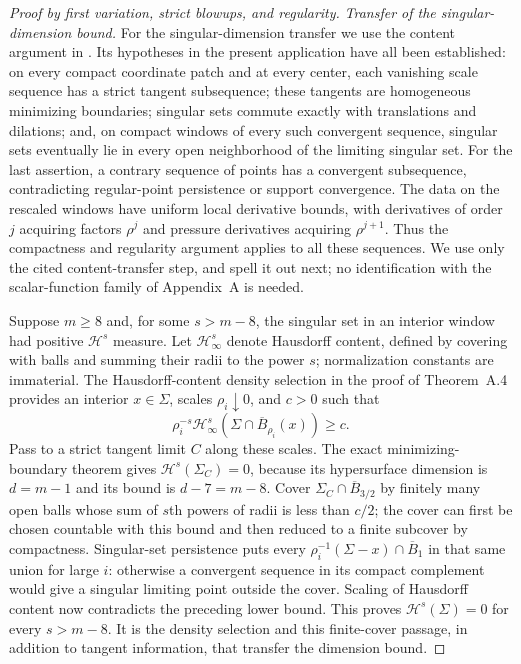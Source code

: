 \documentclass[11pt]{article}
\numberwithin{equation}{section}
\theoremstyle{definition}
\theoremstyle{remark}
\begin{document}
\begin{proof}[Proof by first variation, strict blowups, and regularity]
\emph{Transfer of the singular-dimension bound.}
For the singular-dimension transfer we use the content argument in
\citet[Chapter~1, Theorem~3.26(2), and Appendix~A, proof of Theorem~A.4,
step~(1)]{simonGMT}.
Its hypotheses in the present application have all been established:
on every compact coordinate patch and at every center, each vanishing
scale sequence has a strict tangent subsequence; these tangents are
homogeneous minimizing boundaries; singular sets commute exactly with
translations and dilations; and, on compact windows of every such
convergent sequence, singular sets eventually lie in every open
neighborhood of the limiting singular set.  For the last assertion,
a contrary sequence of points has a convergent subsequence, contradicting
regular-point persistence or support convergence.  The data on the
rescaled windows have uniform local derivative bounds, with derivatives
of order $j$ acquiring factors $\rho^j$ and pressure derivatives acquiring
$\rho^{j+1}$.  Thus the compactness and regularity argument applies to
all these sequences.  We use only the cited content-transfer step, and
spell it out next; no identification with the scalar-function family
of Appendix~A is needed.

Suppose $m\ge8$ and, for some
$s>m-8$, the singular set in an interior window had positive
$\mathcal H^s$ measure.  Let $\mathcal H^s_\infty$ denote Hausdorff
content, defined by covering with balls and summing their radii to
the power $s$; normalization constants are immaterial.
The Hausdorff-content density selection in the proof of Theorem~A.4
provides an interior $x\in\Sigma$, scales $\rho_i\downarrow0$, and
$c>0$ such that
\[
       \rho_i^{-s}\mathcal H^s_\infty
               (\Sigma\cap\overline B_{\rho_i}(x))\ge c.
\]
Pass to a strict tangent limit $C$ along these scales.  The exact
minimizing-boundary theorem gives
$\mathcal H^s(\Sigma_C)=0$, because its hypersurface dimension is
$d=m-1$ and its bound is $d-7=m-8$.
Cover $\Sigma_C\cap\overline B_{3/2}$ by finitely many open balls
whose sum of $s$th powers of radii is less than $c/2$; the cover can
first be chosen countable with this bound and then reduced to a finite
subcover by compactness.  Singular-set persistence puts every
$\rho_i^{-1}(\Sigma-x)\cap\overline B_1$ in that same union for large
$i$: otherwise a convergent sequence in its compact complement would
give a singular limiting point outside the cover.  Scaling of
Hausdorff content now contradicts the preceding lower bound.
This proves $\mathcal H^s(\Sigma)=0$ for every $s>m-8$.
It is the density selection and this finite-cover passage, in addition
to tangent information, that transfer the dimension bound.


\end{proof}
\end{document}
